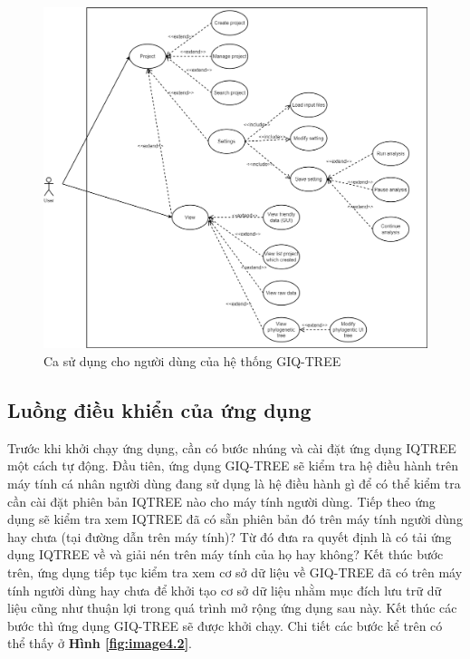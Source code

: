 \documentclass[12pt]{report}
\begin{document}
\begin{figure}[h]
	\centering
	\includegraphics[scale=0.38]{Image/4.1.png}
	\caption{Ca sử dụng cho người dùng của hệ thống GIQ-TREE }
	\label{fig:image4.1}
\end{figure}

\subsection{Luồng điều khiển của ứng dụng}
Trước khi khởi chạy ứng dụng, cần có bước nhúng và cài đặt ứng dụng IQTREE một cách tự động. Đầu tiên, ứng dụng GIQ-TREE sẽ kiểm tra hệ điều hành trên máy tính cá nhân người dùng đang sử dụng là hệ điều hành gì để có thể kiểm tra cần cài đặt phiên bản IQTREE nào cho máy tính người dùng. Tiếp theo ứng dụng sẽ kiểm tra xem IQTREE đã có sẵn phiên bản đó trên máy tính người dùng hay chưa (tại đường dẫn trên máy tính)? Từ đó đưa ra quyết định là có tải ứng dụng IQTREE về và giải nén trên máy tính của họ hay không? Kết thúc bước trên, ứng dụng tiếp tục kiểm tra xem cơ sở dữ liệu về GIQ-TREE đã có trên máy tính người dùng hay chưa để khởi tạo cơ sở dữ liệu nhằm mục đích lưu trữ dữ liệu cũng như thuận lợi trong quá trình mở rộng ứng dụng sau này. Kết thúc các bước thì ứng dụng GIQ-TREE sẽ được khởi chạy. Chi tiết các bước kể trên có thể thấy ở \textbf{Hình \ref{fig:image4.2}}.
\end{document}
